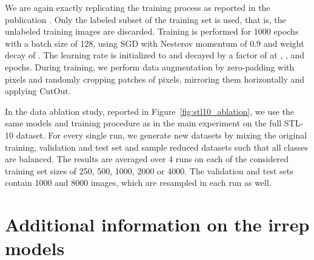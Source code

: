 \documentclass{article}
\begin{document}
{{We are again exactly replicating the training process as reported in the publication \cite{cutout}.
Only the labeled subset of the training set is used, that is, the  unlabeled training images are discarded.
Training is performed for 1000 epochs with a batch size of 128, using SGD with Nesterov momentum of 0.9 and weight decay of .
The learning rate is initialized to  and decayed by a factor of  at , ,  and  epochs.
During training, we perform data augmentation by zero-padding with  pixels and randomly cropping patches of  pixels, mirroring them horizontally and applying CutOut.

In the data ablation study, reported in Figure~\ref{fig:stl10_ablation}, we use the same models and training procedure as in the main experiment on the full STL-10 dataset.
For every single run, we generate new datasets by mixing the original training, validation and test set and sample reduced datasets such that all classes are balanced.
The results are averaged over 4 runs on each of the considered training set sizes of 250, 500, 1000, 2000 or 4000.
The validation and test sets contain 1000 and 8000 images, which are resampled in each run as well.


 	
\section{Additional information on the irrep models}
\label{apx:irrep_models}


}}
\end{document}
